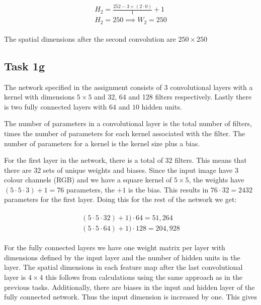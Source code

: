 \documentclass{article}
\begin{document}
\begin{align}
\begin{split}
    H_2 = \frac{252 -3 + (2\cdot0)}{1}  +1 \\
    H_2 = 250
    \implies W_2 = 250
\end{split}
\end{align}

The spatial dimensions after the second convolution are $250 \times 250$

\subsection{Task 1g}
The network specified in the assignment consists of 3 convolutional layers with a kernel with dimensions $ 5\times 5$ and 32, 64 and 128 filters respectively. Lastly there is two fully connected layers with $64$ and $10$ hidden units.

The number of parameters in a convolutional layer is the total number of filters, times the number of parameters for each kernel associated with the filter. The number of parameters for a kernel is the kernel size plus a bias. 

For the first layer in the network, there is a total of 32 filters. This means that there are 32 sets of unique weights and biases. Since the input image have 3 colour channels (RGB) and we have a square kernel of $5 \times 5$, the weights have $(5 \cdot 5 \cdot 3) +1 = 76$ parameters, the $ +1$ is the bias. This results in $76 \cdot 32 = 2432$ parameters for the first layer. 
Doing this for the rest of the network we get:

\begin{align}
    \begin{split}
    (5 \cdot 5 \cdot 32) +1) \cdot 64 = 51,264 \\ %
    (5 \cdot 5 \cdot 64) +1) \cdot 128 = 204,928 %
    \end{split}
\end{align}



For the fully connected layers we have one weight matrix per layer with dimensions defined by the input layer and the number of hidden units in the layer. The spatial dimensions in each feature map after the last convolutional layer is $4 \times 4$ this follows from calculations using the same approach as in the previous tasks. Additionally, there are biases in the input and hidden layer of the fully connected network. Thus the input dimension is increased by one. This gives
\end{document}
